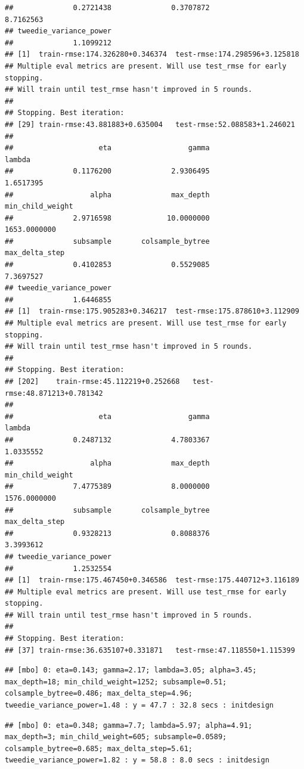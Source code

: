 \documentclass[
]{article}
\begin{document}
\begin{verbatim}
##              0.2721438              0.3707872              8.7162563 
## tweedie_variance_power 
##              1.1099212 
## [1]  train-rmse:174.326280+0.346374  test-rmse:174.298596+3.125818 
## Multiple eval metrics are present. Will use test_rmse for early stopping.
## Will train until test_rmse hasn't improved in 5 rounds.
## 
## Stopping. Best iteration:
## [29] train-rmse:43.881883+0.635004   test-rmse:52.088583+1.246021
## 
##                    eta                  gamma                 lambda 
##              0.1176200              2.9306495              1.6517395 
##                  alpha              max_depth       min_child_weight 
##              2.9716598             10.0000000           1653.0000000 
##              subsample       colsample_bytree         max_delta_step 
##              0.4102853              0.5529085              7.3697527 
## tweedie_variance_power 
##              1.6446855 
## [1]  train-rmse:175.905283+0.346217  test-rmse:175.878610+3.112909 
## Multiple eval metrics are present. Will use test_rmse for early stopping.
## Will train until test_rmse hasn't improved in 5 rounds.
## 
## Stopping. Best iteration:
## [202]    train-rmse:45.112219+0.252668   test-rmse:48.871213+0.781342
## 
##                    eta                  gamma                 lambda 
##              0.2487132              4.7803367              1.0335552 
##                  alpha              max_depth       min_child_weight 
##              7.4775389              8.0000000           1576.0000000 
##              subsample       colsample_bytree         max_delta_step 
##              0.9328213              0.8088376              3.3993612 
## tweedie_variance_power 
##              1.2532554 
## [1]  train-rmse:175.467450+0.346586  test-rmse:175.440712+3.116189 
## Multiple eval metrics are present. Will use test_rmse for early stopping.
## Will train until test_rmse hasn't improved in 5 rounds.
## 
## Stopping. Best iteration:
## [37] train-rmse:36.635107+0.331871   test-rmse:47.118550+1.115399
\end{verbatim}

\begin{verbatim}
## [mbo] 0: eta=0.143; gamma=2.17; lambda=3.05; alpha=3.45; max_depth=18; min_child_weight=1252; subsample=0.51; colsample_bytree=0.486; max_delta_step=4.96; tweedie_variance_power=1.48 : y = 47.7 : 32.8 secs : initdesign
\end{verbatim}

\begin{verbatim}
## [mbo] 0: eta=0.348; gamma=7.7; lambda=5.97; alpha=4.91; max_depth=3; min_child_weight=605; subsample=0.0589; colsample_bytree=0.685; max_delta_step=5.61; tweedie_variance_power=1.82 : y = 58.8 : 8.0 secs : initdesign
\end{verbatim}
\end{document}
